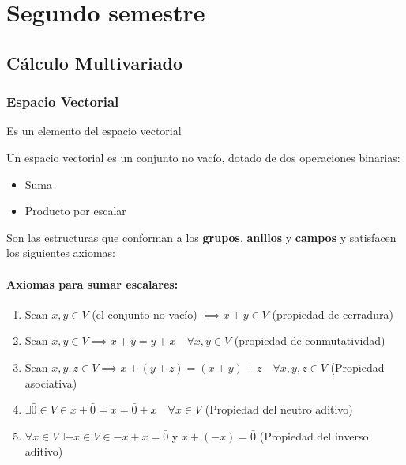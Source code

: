 \part{Segundo semestre}


\chapter{Cálculo Multivariado}


\section{Espacio Vectorial}

\begin{definition}[Vector]
	Es un elemento del espacio vectorial
\end{definition}

Un espacio vectorial es un conjunto no vacío, dotado de dos operaciones binarias:

\begin{itemize}
	\item Suma
	\item Producto por escalar
\end{itemize}

Son las estructuras que conforman a los \textbf{grupos}, \textbf{anillos} y \textbf{campos} y satisfacen los siguientes axiomas:

\subsection{Axiomas para sumar escalares:}

\begin{enumerate}
	\item Sean $x,y\in V$ (el conjunto no vacío) $\implies x+y\in V$ (propiedad de cerradura)
	\item Sean $x,y\in V\implies x+y=y+x\quad \forall x,y\in V$ (propiedad de conmutatividad)
	\item Sean $x,y,z\in V\implies x+(y+z)=(x+y)+z\quad \forall x,y,z\in V$ (Propiedad asociativa)
	\item $\exists \bar{0}\in V \in x+\bar{0}=x=\bar{0}+x\quad \forall x\in V$ (Propiedad del neutro aditivo)
	\item $\forall x\in V \exists -x\in V \in -x+x=\bar{0}$ y $x+(-x)=\bar{0}$ (Propiedad del inverso aditivo)
\end{enumerate}

